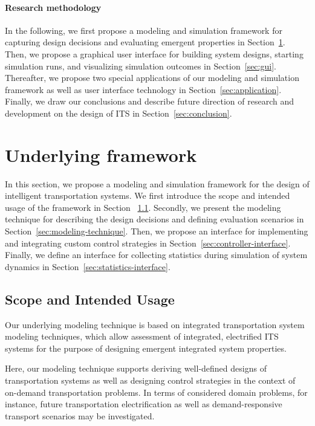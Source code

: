 \documentclass[10pt,twocolumn]{article}
\begin{document}
\paragraph{Research methodology}

In the following, we first propose a modeling and simulation framework for capturing design decisions and evaluating emergent properties in Section~\ref{sec:framework}.
Then, we propose a graphical user interface for building system designs, starting simulation runs, and visualizing simulation outcomes in Section~\ref{sec:gui}.
Thereafter, we propose two special applications of our modeling and simulation framework as well as user interface technology in Section~\ref{sec:application}.
Finally, we draw our conclusions and describe future direction of research and development on the design of ITS in Section~\ref{sec:conclusion}. 

\section{Underlying framework}
\label{sec:framework}

In this section, we propose a modeling and simulation framework for the design of intelligent transportation systems.
We first introduce the scope and intended usage of the framework in Section ~\ref{sec:scope}.
Secondly, we present the modeling technique for describing the design decisions and defining evaluation scenarios in Section~\ref{sec:modeling-technique}.
Then, we propose an interface for implementing and integrating custom control strategies in Section~\ref{sec:controller-interface}.
Finally, we define an interface for collecting statistics during simulation of system dynamics in Section~\ref{sec:statistics-interface}.

\subsection{Scope and Intended Usage}
\label{sec:scope}
Our underlying modeling technique is based on integrated transportation system modeling techniques, which allow assessment of integrated, electrified ITS systems for the purpose of designing emergent integrated system properties.

Here, our modeling technique supports deriving well-defined designs of transportation systems as well as designing control strategies in the context of on-demand transportation problems. In terms of considered domain problems, for instance, future transportation electrification as well as demand-responsive transport scenarios may be investigated.
\end{document}

